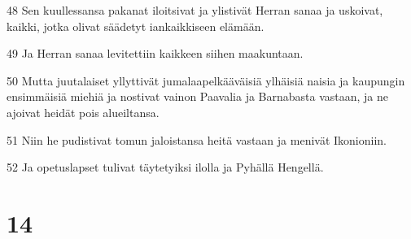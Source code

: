 \par 48 Sen kuullessansa pakanat iloitsivat ja ylistivät Herran sanaa ja uskoivat, kaikki, jotka olivat säädetyt iankaikkiseen elämään.
\par 49 Ja Herran sanaa levitettiin kaikkeen siihen maakuntaan.
\par 50 Mutta juutalaiset yllyttivät jumalaapelkääväisiä ylhäisiä naisia ja kaupungin ensimmäisiä miehiä ja nostivat vainon Paavalia ja Barnabasta vastaan, ja ne ajoivat heidät pois alueiltansa.
\par 51 Niin he pudistivat tomun jaloistansa heitä vastaan ja menivät Ikonioniin.
\par 52 Ja opetuslapset tulivat täytetyiksi ilolla ja Pyhällä Hengellä.

\chapter{14}

